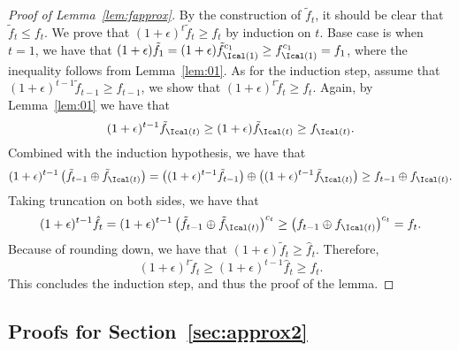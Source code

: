\begin{proof}[Proof of Lemma~\ref{lem:fapprox}]
By the construction of $\tilde{f}_t$, it should be clear that $\tilde{f}_t\le f_t$. We prove that $(1+\epsilon)^t\tilde{f}_t\ge f_t$ by induction on $t$. Base case is when $t=1$, we have that $(1+\epsilon)\tilde{f}_1=(1+\epsilon)\tilde{f}_{\Ical(1)}^{c_1} \ge f_{\Ical(1)}^{c_1}=f_1$, where the inequality follows from Lemma~\ref{lem:01}. As for the induction step, assume that $(1+\epsilon)^{t-1}\tilde{f}_{t-1}\ge f_{t-1}$, we show that $(1+\epsilon)^t\tilde{f}_t\ge f_t$. Again, by Lemma~\ref{lem:01} we have that
$$
(1+\epsilon)^{t-1}\tilde{f}_{\Ical(t)}\ge (1+\epsilon)\tilde{f}_{\Ical(t)}\ge f_{\Ical(t)}.
$$
Combined with the induction hypothesis, we have that
$$
(1+\epsilon)^{t-1}\left(\tilde{f}_{t-1}\oplus \tilde{f}_{\Ical(t)}\right) = \left((1+\epsilon)^{t-1}\tilde{f}_{t-1}\right) \oplus \left((1+\epsilon)^{t-1}\tilde{f}_{\Ical(t)}\right)\ge f_{t-1}\oplus f_{\Ical(t)}.
$$
Taking truncation on both sides, we have that $$
(1+\epsilon)^{t-1}\hat{f}_t=(1+\epsilon)^{t-1}\left(\tilde{f}_{t-1}\oplus \tilde{f}_{\Ical(t)}\right)^{c_t}\ge \left(f_{t-1}\oplus f_{\Ical(t)}\right)^{c_t}=f_t.
$$
Because of rounding down, we have that $(1+\epsilon)\tilde{f}_t\ge \hat{f}_t$. Therefore, 
$$
(1+\epsilon)^t\tilde{f}_t\ge (1+\epsilon)^{t-1}\hat{f}_t\ge f_t.
$$
This concludes the induction step, and thus the proof of the lemma.
\end{proof}

\subsection{Proofs for Section~\ref{sec:approx2}}

